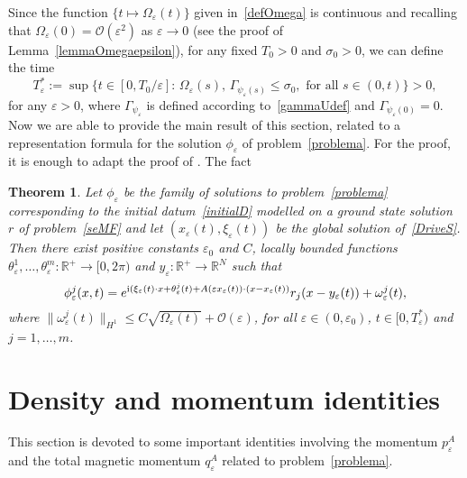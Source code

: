 \documentclass[11pt]{amsart}
\numberwithin{equation}{section}
\newtheorem{theorem}{Theorem}[section]
\theoremstyle{definition}
\begin{document}
Since the function $\{t\mapsto\Omega_{\varepsilon}(t)\}$ given
in~\eqref{defOmega} is continuous and recalling that
$\Omega_{\varepsilon}(0)={\mathcal O}({\varepsilon}^2)$ as ${\varepsilon}\to 0$ (see the proof of
Lemma~\ref{lemmaOmegaepsilon}), for any fixed $T_0>0$ and
$\sigma_0>0$, we can define the time
\begin{equation}
\label{Tepsdef} T^*_{\varepsilon}:=\sup\big\{t\in
[0,T_0/{\varepsilon}]:\,\Omega_{\varepsilon}(s),\,\Gamma_{\psi_{\varepsilon}(s)}\leq\sigma_0,\,\,\text{for all $s\in
(0,t)$}\big\}>0,
\end{equation}
for any ${\varepsilon}>0$, where $\Gamma_{\psi_{\varepsilon}}$ is defined according to~\eqref{gammaUdef} and $\Gamma_{\psi_{\varepsilon}(0)}=0$.
Now we are able to provide the main result of this section, related to
a representation formula for the solution $\phi_{\varepsilon}$ of
problem~\eqref{problema}. For the proof, it is enough to adapt the
proof of \cite[Theorem~4.2]{squa}. The fact

\begin{theorem}\label{chiave}
Let $\phi_{\varepsilon}$ be the family of solutions to
problem~\eqref{problema} corresponding to the initial datum~\eqref{initialD}
modelled on a ground state solution $r$ of problem~\eqref{seMF} and let
$(x_{\varepsilon}(t), \xi_{\varepsilon}(t))$ be the global solution of~\eqref{DriveS}.
Then there exist positive constants ${\varepsilon}_{0}$ and $C$, locally bounded functions
$\theta^1_{\varepsilon}, \dots, \theta^m_{\varepsilon}:{{\mathbb R}}^+\to[0,2\pi)$ and $y_{\varepsilon}:{{\mathbb R}}^+\to{{\mathbb R}}^N$ such that
\begin{equation*}
    \phi_{\varepsilon}^j(x,t)=e^{{{\rm i}}(\xi_{\varepsilon}(t)\cdot x+\theta^j_{\varepsilon}(t)+A({\varepsilon} x_{\varepsilon}(t))
    \cdot (x-x_{\varepsilon}(t))}r_j(x-y_{\varepsilon}(t))+\omega^j_{\varepsilon}(t),
\end{equation*}
where $\|\omega^j_{\varepsilon}(t)\|_{H^1}\leq C\sqrt{\Omega_{\varepsilon}(t)}+{\mathcal O}({\varepsilon})$,
for all ${\varepsilon}\in(0,{\varepsilon}_{0})$, $t\in [0,T_{\varepsilon}^{*})$ and $j=1,
\dots, m$.
\end{theorem}

\section{Density and momentum identities}
\label{masssection}

This section is devoted to some important identities involving the
momentum $p_{\varepsilon}^A$ and the total magnetic momentum $q_{\varepsilon}^A$
related to problem~\eqref{problema}.
\end{document}
